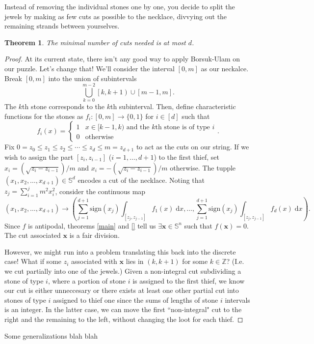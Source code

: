 \documentclass[12pt]{amsart}
\newtheorem{thm}{Theorem}[section]
\theoremstyle{definition}
\begin{document}
    Instead of removing the individual stones one by one, you decide to split the jewels by making as few cuts as possible to the necklace, divvying out the remaining strands between yourselves. 

    \begin{thm}
        The minimal number of cuts needed is at most $d$.
    \end{thm}

    \begin{proof}
        At its current state, there isn't any good way to apply Borsuk-Ulam on our puzzle. Let's change that! We'll consider the interval $[0,m]$ as our neckalce. Break $[0,m]$ into the union of subintervals $$\bigcup_{k=0}^{m-2} \left[k, k+1\right) \cup \left[m-1, m\right].$$ The $k$th stone corresponds to the $k$th subinterval. Then, define characteristic functions for the stones as $f_i:[0,m] \to \{0,1\}$ for $i \in [d]$ such that $$f_i(x) = \begin{cases} 1 & x \in [k-1, k) \text{ and the $k$th stone is of type $i$}\\ 0 & \text{otherwise} \end{cases}.$$ Fix $0 = z_0 \leq z_1 \leq z_2 \leq \cdots \leq z_d \leq m= z_{d+1}$ to act as the cuts on our string. If we wish to assign the part $[z_i,z_{i-1}]$ ($i = 1, \ldots, d+1$) to the first thief, set $x_i = \left(\sqrt{z_{i} - z_{i-1}}\right)/m$ and $x_i = -\left(\sqrt{z_i - z_{i-1}}\right)/m$ otherwise. The tupple $(x_1,x_2,\ldots,x_{d+1}) \in \mathbb S^d$ encodes a cut of the necklace. Noting that $z_j = \sum_{i=1}^{j} m^2x_i^2$, consider the continuous map $$(x_1,x_2,\ldots,x_{d+1}) \to \left(\sum_{j=1}^{d+1} \mathrm{sign}(x_j) \int_{[z_j,z_{j-1}]} f_1(x) \; \mathrm{d}x , \ldots, \sum_{j=1}^{d+1} \mathrm{sign}(x_j) \int_{[z_j,z_{j-1}]} f_d(x) \; \mathrm{d}x\right).$$ Since $f$ is antipodal, theorems \ref{main} and \ref{} tell us $\exists \mathbf x \in \mathbb S^n$ such that $f(\mathbf x) = 0$. The cut associated $\mathbf x$ is a fair division. 

        However, we might run into a problem translating this back into the discrete case! What if some $z_i$ associated with $\mathbf x$ lies in $\left(k, k+1\right)$ for some $k \in \mathbb Z$? (I.e. we cut partially into one of the jewels.) Given a non-integral cut subdividing a stone of type $i$, where a portion of stone $i$ is assigned to the first thief, we know our cut is either unneccesary or there exists at least one other partial cut into stones of type $i$ assigned to thief one since the sums of lengths of stone $i$ intervals is an integer. In the latter case, we can move the first ``non-integral" cut to the right and the remaining to the left, without changing the loot for each thief.
    \end{proof}

    Some generalizations blah blah

    
    
    
\end{document}
